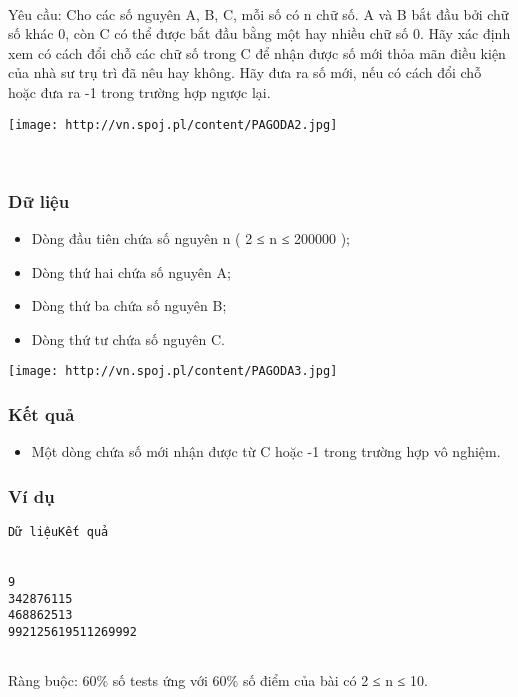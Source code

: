  

Yêu cầu: Cho các số nguyên A, B, C, mỗi số có n chữ số. A và B bắt đầu bởi chữ số khác 0, còn C có thể được bắt đầu bằng một hay nhiều chữ số 0. Hãy xác định xem có cách đổi chỗ các chữ số trong C để nhận được số mới thỏa mãn điều kiện của nhà sư trụ trì đã nêu hay không. Hãy đưa ra số mới, nếu có cách đổi chỗ hoặc đưa ra -1 trong trường hợp ngược lại.


\texttt{[image: http://vn.spoj.pl/content/PAGODA2.jpg]}

 

\subsubsection{Dữ liệu}
\begin{itemize}
	\item Dòng đầu tiên chứa số nguyên n ( 2 ≤ n ≤ 200000 );
	\item Dòng thứ hai chứa số nguyên A;
	\item Dòng thứ ba chứa số nguyên B;
	\item Dòng thứ tư chứa số nguyên C.
\end{itemize}


\texttt{[image: http://vn.spoj.pl/content/PAGODA3.jpg]}

\subsubsection{Kết quả}
\begin{itemize}
	\item Một dòng chứa số mới nhận được từ C hoặc -1 trong trường hợp vô nghiệm.
\end{itemize}

\subsubsection{Ví dụ}
\begin{verbatim}
Dữ liệuKết quả


9
342876115
468862513
992125619511269992


\end{verbatim}

Ràng buộc: 60\% số tests ứng với 60\% số điểm của bài có 2 ≤ n ≤ 10.
